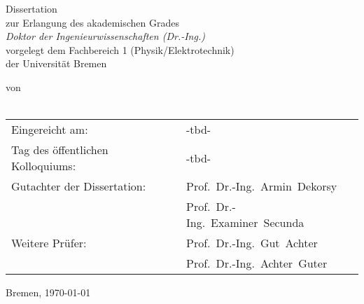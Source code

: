 \thispagestyle{empty}
\vfill
{}
\vspace*{1cm}
\begin{center}
    {\Large Dissertation} \\[1ex] zur Erlangung des akademischen Grades \\[1ex]
            {\em Doktor der Ingenieurwissenschaften (Dr.-Ing.)} \\[1ex]
    vorgelegt dem Fachbereich 1 (Physik/Elektrotechnik)\\[1ex]
    der Universit{\"a}t Bremen\\
      \vspace*{0,8cm}

    von   \vspace*{0,8cm}\\
    {\large \Autor}\\
  \vspace*{1,6cm}
  \begin{tabular}{ll}
Eingereicht am:                   & -tbd-\\
Tag des öffentlichen Kolloquiums: & -tbd-\\
Gutachter der Dissertation:       &  Prof.~Dr.-Ing.~Armin~Dekorsy\\
                                  &  Prof.~Dr.-Ing.~Examiner~Secunda \\
Weitere Prüfer:                   &  Prof.~Dr.-Ing.~Gut~Achter \\
                                  &  Prof.~Dr.-Ing.~Achter~Guter \\

\end{tabular}
  \vspace*{1cm}

  \vfill

  Bremen, \today

\end{center}
\vfill
\newpage
\thispagestyle{empty}
 \phantom{x}
\newpage
